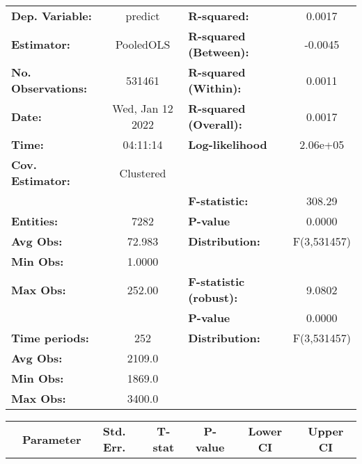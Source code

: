 \begin{center}
\begin{tabular}{lclc}
\toprule
\textbf{Dep. Variable:}    &      predict       & \textbf{  R-squared:         }   &      0.0017      \\
\textbf{Estimator:}        &     PooledOLS      & \textbf{  R-squared (Between):}  &     -0.0045      \\
\textbf{No. Observations:} &       531461       & \textbf{  R-squared (Within):}   &      0.0011      \\
\textbf{Date:}             &  Wed, Jan 12 2022  & \textbf{  R-squared (Overall):}  &      0.0017      \\
\textbf{Time:}             &      04:11:14      & \textbf{  Log-likelihood     }   &     2.06e+05     \\
\textbf{Cov. Estimator:}   &     Clustered      & \textbf{                     }   &                  \\
\textbf{}                  &                    & \textbf{  F-statistic:       }   &      308.29      \\
\textbf{Entities:}         &        7282        & \textbf{  P-value            }   &      0.0000      \\
\textbf{Avg Obs:}          &       72.983       & \textbf{  Distribution:      }   &   F(3,531457)    \\
\textbf{Min Obs:}          &       1.0000       & \textbf{                     }   &                  \\
\textbf{Max Obs:}          &       252.00       & \textbf{  F-statistic (robust):} &      9.0802      \\
\textbf{}                  &                    & \textbf{  P-value            }   &      0.0000      \\
\textbf{Time periods:}     &        252         & \textbf{  Distribution:      }   &   F(3,531457)    \\
\textbf{Avg Obs:}          &       2109.0       & \textbf{                     }   &                  \\
\textbf{Min Obs:}          &       1869.0       & \textbf{                     }   &                  \\
\textbf{Max Obs:}          &       3400.0       & \textbf{                     }   &                  \\
\bottomrule
\end{tabular}
\begin{tabular}{lcccccc}
                & \textbf{Parameter} & \textbf{Std. Err.} & \textbf{T-stat} & \textbf{P-value} & \textbf{Lower CI} & \textbf{Upper CI}  \\

\end{tabular}
\end{center}
